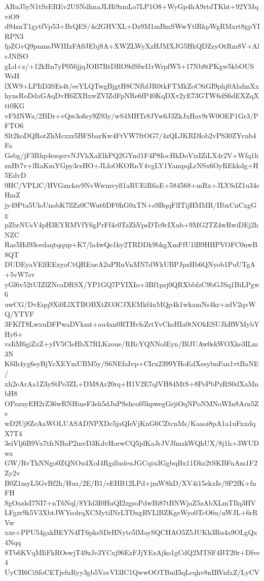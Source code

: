 ARuJ5yN1tSrEREv2USNdhnaJLHi9zmLo7LP1O8+WyGp4hA9rtdTKht+92YMqviO9
d94znT1gytfVp53+BrQES/4s2GHVXL+Dz9M1mBmSWwYtlRkpWgRMxrt8gpYIRPN3
fpZGvQ9pnmsJWIIIzFA0JEbj8A+XWZLWyXzHJMXJG5HkQDZzyOtRm8V+AlcJNfSO
gLd+z/+12kRn7yP056jjqJOB7RtDRO9dSfwI1rWrpfW5+17Nb8tPKgw5kbOUSWsH
lXW9+LPIiD3SEs4t/eeYLQTwgBjgtH8CNfbfJR0tkFTMkZoC8iGI9phj0AlafmXx
hynsRoDdaGAqDvH6ZXBxwZVlZdFpNRe6fP40KqDXv2yE73GTW6dS6dEXZqXtt0KG
vFMNWa/2BDr+vQw3o6ry9Z93y/wS4MHTr8JYw6J3ZkJxHav9rW0OEP1Gr3/PFTO6
Slt2koDQRotZhMcxzz5BFSbarKw4FtVW7ftOG7/4zQLJKRDIob2vPS30ZYvnb4Fa
Gsbg/jF3Rhp4ezqervNJVhXaElkPQ2GYnd1F4P8IocHkDoVizIZiLX4r2V+Wfq1h
znHt7v+lRaKmYGpy3csHO+JLfoOKORnY4vgLY1YampqLrNSx6OyREkkdg+H5EdvD
9HC/VPLlC/HVGzn4av9NvWwmvyfl1aRUEiR6aE+584568+mRx+JLYSdZ1u34cHmZ
jy49Pta5UloUnobK7llZz0CWut6DF0hG0xTN+s9BqqFlITijHMMR/IIbxCnCxgGg
pZbrNUsV4pH3EYRMVfY6gPrFf4c0TzZhVpsDTe9cIXub+9MG2TZ4wRwiDEj2hNZC
Ras5Hd93cedaqtqqup+K7/la4wQe1ky2TRDDk9bkgXmFfU1lB9HHPVOFC0nwB8QT
DUDEyaVElfEExyaCtQREueA2uPRuVnMN7dWkUBPJpzHb6QNyob1PuUTgA+5vW7sv
yGl6v52tUIZlZNcaDRSX/YP1GQ7PYIXIo+3Bf1pzj0QRXbbfzC9bGJSq1BiLPgw6
uwCG/DvEqq9Xi0LlXTBOBXtZO3CJXEMkf4uMQp4k1wkamNs4kr+zdV2qvWQ/YTYF
3FKfT8LwxuDFPwaDVkmt+au4xn0RTHvfsZrtYvCksHIa0tNOkESUJhRWMybYHy6+
vsIiM6giZxZ+yIV5CleHbX7RLKzoue/RRcYQNNolEyn/BlJUAw0skWOXke3ILm3N
K6lh4yg6syBjYcXEYmUBM5y/S6NEfaIvp+CIru2399YHoEdXesybnFan1vtBaNE/
xh2eArAa1Z3yStPe3ZL+DM8Ar20rq+H1V2E7qlVH84MtS+8PePbPzRS0dXaMnbH8
OPszuyEH2rZ36wRNHineF3eh5dJuPSshco05hpwegGrjiOqNPoNMNoWIn8Arn5Ze
wD2Uj8ZeAaWOLUASADNPXDc5jaQIeVjKnG6CZtcnMs/Kaaoi8pA1a1uFnxdqX7T4
3eiVlj6B9Va7tfrNBaP2mvD3KdvHorwCQ5jdKaJrJVJfmzkWQhUX/8j1h+3WUDwz
GW/RvThNNgo0ZQNOu4XoI4RgdludeuJGCqiu3GgbqBx11Dkz2tSKBFnAm1F2Zy2v
B0Z1myL5GvBf2h/Hua/2E/B1/eEHB12LPd+jmW8hD/XV4i15ekxIe/9P2fK+fnFH
SgOazlsI7NI7+nT6Nql/8YId3I0HuQI2zgsoPdwBi87tBNWjaZ5zAbXLmTIlq3HV
LFgzr9k5V3XbtJWYsolrqXCMytiINrLTDngRVLlBZKgeWyo0TcO6u/nWJL+6rRVw
xxe+PPU54gakBEYN4IT6pksSDrHNyte5lMaySQCHAO5Z5JUKh3Ru4a9OLgQx4Nqq
8Tb6KVqMIiFkROswjT49zJc3YCxj96EzFJjYEzAjko1gCdQ2MTSF4BT20r+Dfve4
UyCH6CiSfoCETjefuRyy3gb5VavVI3IC1QwwOOTBuiI5qLcqhv8nIRVnfxZ/LyCV
